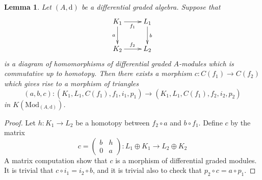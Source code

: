 \documentclass{stacks-project}
\theoremstyle{plain}
\newtheorem{lemma}[subsection]{Lemma}
\theoremstyle{definition}
\theoremstyle{remark}
\numberwithin{equation}{subsection}
\begin{document}
\begin{lemma}
\label{lemma-functorial-cone}
Let $(A, \text{d})$ be a differential graded algebra.
Suppose that
$$
\xymatrix{
K_1 \ar[r]_{f_1} \ar[d]_a & L_1 \ar[d]^b \\
K_2 \ar[r]^{f_2} & L_2
}
$$
is a diagram of homomorphisms of differential graded $A$-modules which is
commutative up to homotopy.
Then there exists a morphism $c : C(f_1) \to C(f_2)$ which gives rise to
a morphism of triangles
$$
(a, b, c) : (K_1, L_1, C(f_1), f_1, i_1, p_1) \to
(K_1, L_1, C(f_1), f_2, i_2, p_2)
$$
in $K(\text{Mod}_{(A, \text{d})})$.
\end{lemma}

\begin{proof}
Let $h : K_1 \to L_2$ be a homotopy between $f_2 \circ a$ and $b \circ f_1$.
Define $c$ by the matrix
$$
c =
\left(
\begin{matrix}
b & h \\
0 & a
\end{matrix}
\right) :
L_1 \oplus K_1 \to L_2 \oplus K_2
$$
A matrix computation show that $c$ is a morphism of differential
graded modules. It is trivial that $c \circ i_1 = i_2 \circ b$, and it is
trivial also to check that $p_2 \circ c = a \circ p_1$.
\end{proof}
\end{document}
